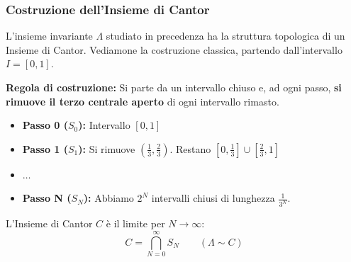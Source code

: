 \documentclass[openany]{book}
\theoremstyle{definition}
\theoremstyle{remark}
\begin{document}
\subsubsection*{Costruzione dell'Insieme di Cantor}

L'insieme invariante $\Lambda$ studiato in precedenza ha la struttura topologica di un Insieme di Cantor.
Vediamone la costruzione classica, partendo dall'intervallo $I =[0, 1]$.

\textbf{Regola di costruzione:}
Si parte da un intervallo chiuso e, ad ogni passo, \textbf{si rimuove il terzo centrale aperto} di ogni intervallo rimasto.

\begin{itemize}
    \item \textbf{Passo 0 ($S_0$):} Intervallo $[0, 1]$
    \item \textbf{Passo 1 ($S_1$):} Si rimuove $\left(\frac{1}{3}, \frac{2}{3}\right)$. Restano $\left[0, \frac{1}{3}\right] \cup \left[\frac{2}{3}, 1\right]$
    \item $\dots$
    \item \textbf{Passo N ($S_N$):} Abbiamo $2^N$ intervalli chiusi di lunghezza $\frac{1}{3^N}$.
\end{itemize}

L'Insieme di Cantor $C$ è il limite per $N \to \infty$:
$$ C = \bigcap_{N=0}^{\infty} S_N \quad \quad (\Lambda \sim C) $$
\end{document}
